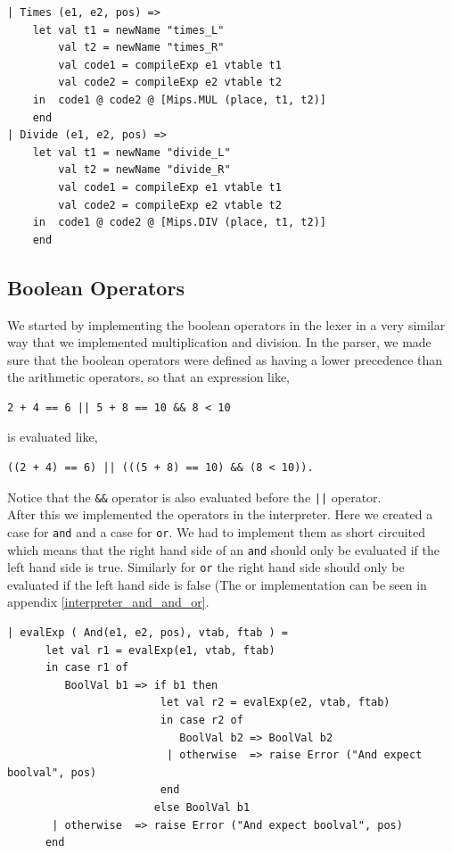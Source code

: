 \documentclass[11pt]{article}
\begin{document}
    \begin{lstlisting}[basicstyle=\small]
| Times (e1, e2, pos) =>
    let val t1 = newName "times_L"
        val t2 = newName "times_R"
        val code1 = compileExp e1 vtable t1
        val code2 = compileExp e2 vtable t2
    in  code1 @ code2 @ [Mips.MUL (place, t1, t2)]
    end
| Divide (e1, e2, pos) =>
    let val t1 = newName "divide_L"
        val t2 = newName "divide_R"
        val code1 = compileExp e1 vtable t1
        val code2 = compileExp e2 vtable t2
    in  code1 @ code2 @ [Mips.DIV (place, t1, t2)]
    end
    \end{lstlisting}

    \subsection{Boolean Operators}
    We started by implementing the boolean operators in the lexer in a very
    similar way that we implemented multiplication and division.  In the parser,
    we made sure that the boolean operators were defined as having a lower
    precedence than the arithmetic operators, so that an expression like,

    \begin{lstlisting}[basicstyle=\small]
        2 + 4 == 6 || 5 + 8 == 10 && 8 < 10
    \end{lstlisting}

    is evaluated like,

    \begin{lstlisting}[basicstyle=\small]
        ((2 + 4) == 6) || (((5 + 8) == 10) && (8 < 10)).
    \end{lstlisting}

    Notice that the \texttt{\&\&} operator is also evaluated before the
    \texttt{||} operator. \\

    After this we implemented the operators in the interpreter.  Here we created
    a case for \texttt{and} and a case for \texttt{or}.  We had to implement
    them as short circuited which means that the right hand side of an
    \texttt{and} should only be evaluated if the left hand side is true.
    Similarly for \texttt{or} the right hand side should only be evaluated if
    the left hand side is false (The or implementation can be seen in appendix
    \ref{interpreter_and_and_or}.

    \begin{lstlisting}[basicstyle=\small]
| evalExp ( And(e1, e2, pos), vtab, ftab ) =
      let val r1 = evalExp(e1, vtab, ftab)
      in case r1 of
         BoolVal b1 => if b1 then
                        let val r2 = evalExp(e2, vtab, ftab)
                        in case r2 of
                           BoolVal b2 => BoolVal b2
                         | otherwise  => raise Error ("And expect boolval", pos)
                        end
                       else BoolVal b1
       | otherwise  => raise Error ("And expect boolval", pos)
      end

    \end{lstlisting}
\end{document}
